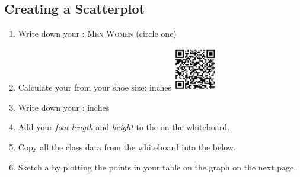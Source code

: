 \documentclass[12pt,letterpaper]{memoir}
\begin{document}
\pagestyle{empty}
\checkandfixthelayout
\raggedbottom


\subsection*{Creating a Scatterplot}

\begin{enumerate}[fullwidth,label={\Large$\bm{\square}$}\,\arabic*.]
    \item Write down your : \underline{\hspace{1in}} 
        {\scshape Men}
        \quad 
        {\scshape Women} (circle one)
    \item Calculate your  from your shoe size: \underline{\hspace{1in}} inches
            \includegraphics[width=0.75in]{QR-shoe-size-conversion}
    \item Write down your : \underline{\hspace{1in}} inches
    \item Add your {\itshape foot length} and {\itshape height} to the  on the whiteboard.
    \item Copy all the class data from the whiteboard into the  below.
    \item Sketch a  by plotting the points in your table on the graph on the next page.
\end{enumerate}
\end{document}

